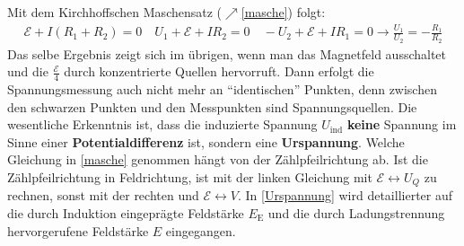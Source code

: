 		         Mit dem Kirchhoffschen Maschensatz ($\nearrow$\ref{masche}) folgt:
		        \begin{equation}\begin{split}
				        \mathcal{E} + I (R_1+R_2)= 0 \quad U_1+\mathcal{E} + I R_2 = 0 \quad -U_2+\mathcal{E} + I R_1 = 0 \to \boxed{\frac{U_1}{U_2} = -\frac{R_1}{R_2}}
			        \end{split}\end{equation}
		        Das selbe Ergebnis zeigt sich im übrigen, wenn man das Magnetfeld ausschaltet und die $\frac{\mathcal{E}}{4}$ durch konzentrierte Quellen hervorruft. Dann erfolgt die Spannungsmessung auch nicht mehr an \enquote{identischen} Punkten, denn zwischen den schwarzen Punkten und den Messpunkten sind Spannungsquellen. Die wesentliche Erkenntnis ist, dass die induzierte Spannung $U_\text{ind}$ \textbf{keine} Spannung im Sinne einer \textbf{Potentialdifferenz} ist, sondern eine \textbf{Urspannung}. Welche Gleichung in \ref{masche} genommen hängt von der Zählpfeilrichtung ab. Ist die Zählpfeilrichtung in Feldrichtung, ist mit der linken Gleichung mit $\mathcal{E}\leftrightarrow U_Q$ zu rechnen, sonst mit der rechten und $\mathcal{E}\leftrightarrow V$. In \ref{Urspannung} wird detaillierter auf die durch Induktion eingeprägte Feldstärke $E_\mathrm{E}$ und die durch Ladungstrennung hervorgerufene Feldstärke $E$ eingegangen.
